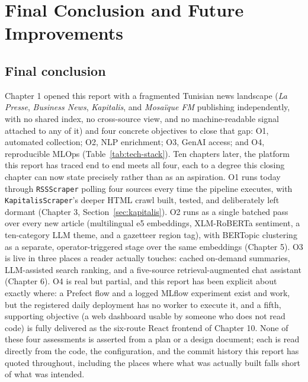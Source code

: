\chapter{Final Conclusion and Future Improvements}

\section{Final conclusion}
\label{sec:final-conclusion}
\begin{sloppypar}
Chapter 1 opened this report with a fragmented Tunisian news landscape (\textit{La Presse}, \textit{Business News}, \textit{Kapitalis}, and \textit{Mosaïque FM} publishing independently, with no shared index, no cross-source view, and no machine-readable signal attached to any of it) and four concrete objectives to close that gap: O1, automated collection; O2, NLP enrichment; O3, GenAI access; and O4, reproducible MLOps (Table~\ref{tab:tech-stack}). Ten chapters later, the platform this report has traced end to end meets all four, each to a degree this closing chapter can now state precisely rather than as an aspiration. O1 runs today through \texttt{RSSScraper} polling four sources every time the pipeline executes, with \texttt{KapitalisScraper}'s deeper HTML crawl built, tested, and deliberately left dormant (Chapter 3, Section~\ref{sec:kapitalis}). O2 runs as a single batched pass over every new article (multilingual e5 embeddings, XLM-RoBERTa sentiment, a ten-category LLM theme, and a gazetteer region tag), with BERTopic clustering as a separate, operator-triggered stage over the same embeddings (Chapter 5). O3 is live in three places a reader actually touches: cached on-demand summaries, LLM-assisted search ranking, and a five-source retrieval-augmented chat assistant (Chapter 6). O4 is real but partial, and this report has been explicit about exactly where: a Prefect flow and a logged MLflow experiment exist and work, but the registered daily deployment has no worker to execute it, and a fifth, supporting objective (a web dashboard usable by someone who does not read code) is fully delivered as the six-route React frontend of Chapter 10. None of these four assessments is asserted from a plan or a design document; each is read directly from the code, the configuration, and the commit history this report has quoted throughout, including the places where what was actually built falls short of what was intended.
\end{sloppypar}

